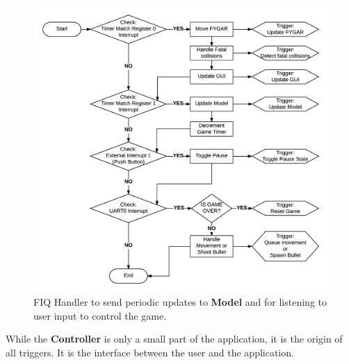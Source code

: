   \begin{figure}[H]
    \centering
    \includegraphics[scale=0.6]{images/fiq-handler.png}
    \caption{\label{fig:fiq-handler} FIQ Handler to send periodic updates to \textbf{Model} and for listening to user input to control the game.}
  \end{figure}


  While the \textbf{Controller} is only a small part of the application, it is the origin of all triggers. It is the interface between the user and the application.

